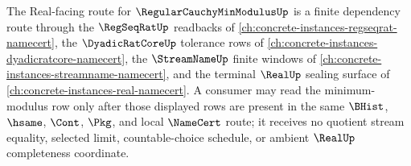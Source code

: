 The Real-facing route for $\RegularCauchyMinModulusUp$ is a finite dependency route through the $\RegSeqRatUp$ readbacks of \autoref{ch:concrete-instances-regseqrat-namecert}, the $\DyadicRatCoreUp$ tolerance rows of \autoref{ch:concrete-instances-dyadicratcore-namecert}, the $\StreamNameUp$ finite windows of \autoref{ch:concrete-instances-streamname-namecert}, and the terminal $\RealUp$ sealing surface of \autoref{ch:concrete-instances-real-namecert}. A consumer may read the minimum-modulus row only after those displayed rows are present in the same $\BHist$, $\hsame$, $\Cont$, $\Pkg$, and local $\NameCert$ route; it receives no quotient stream equality, selected limit, countable-choice schedule, or ambient $\RealUp$ completeness coordinate.
